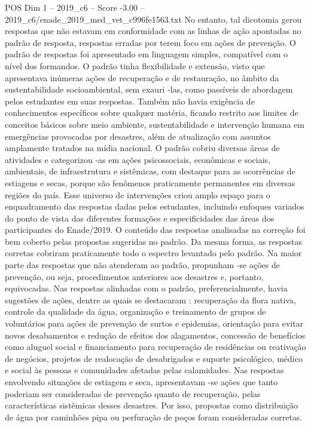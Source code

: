 \begin{textsample}{POS Dim 1 – 2019\_c6 – Score -3.00 – 2019\_c6/enade\_2019\_med\_vet\_c996fe1563.txt}
No entanto, tal dicotomia gerou respostas que não estavam em conformidade com as linhas de ação apontadas no padrão de resposta, respostas erradas por terem foco em ações de prevenção.
O padrão de respostas foi apresentado em linguagem simples, compatível com o nível dos formandos.
O padrão tinha flexibilidade e extensão, visto que apresentava inúmeras ações de recuperação e de restauração, no âmbito da sustentabilidade socioambiental, sem exauri -las, como passíveis de abordagem pelos estudantes em suas respostas.
Também não havia exigência de conhecimentos específicos sobre qualquer matéria, ficando restrito aos limites de conceitos básicos sobre meio ambiente, sustentabilidade e intervenção humana em emergências provocadas por desastres, além de atualização com assuntos amplamente tratados na mídia nacional.
O padrão cobriu diversas áreas de atividades e categorizou -as em ações psicossociais, econômicas e sociais, ambientais, de infraestrutura e sistêmicas, com destaque para as ocorrências de estiagens e secas, porque são fenômenos praticamente permanentes em diversas regiões do país.
Esse universo de intervenções criou amplo espaço para o enquadramento das respostas dadas pelos estudantes, incluindo enfoques variados do ponto de vista das diferentes formações e especificidades das áreas dos participantes do Enade/2019.
O conteúdo das respostas analisadas na correção foi bem coberto pelas propostas sugeridas no padrão.
Da mesma forma, as respostas corretas cobriram praticamente todo o espectro levantado pelo padrão.
Na maior parte das respostas que não atenderam ao padrão, propunham -se ações de prevenção, ou seja, procedimentos anteriores aos desastres e, portanto, equivocadas.
Nas respostas alinhadas com o padrão, preferencialmente, havia sugestões de ações, dentre as quais se destacaram : recuperação da flora nativa, controle da qualidade da água, organização e treinamento de grupos de voluntários para ações de prevenção de surtos e epidemias, orientação para evitar novos desabamentos e redução de efeitos dos alagamentos, concessão de benefícios como aluguel social e financiamento para recuperação de residências ou reativação de negócios, projetos de realocação de desabrigados e suporte psicológico, médico e social às pessoas e comunidades afetadas pelas calamidades.
Nas respostas envolvendo situações de estiagem e seca, apresentavam -se ações que tanto poderiam ser consideradas de prevenção quanto de recuperação, pelas características sistêmicas desses desastres.
Por isso, propostas como distribuição de água por caminhões pipa ou perfuração de poços foram consideradas corretas.

\end{textsample}
